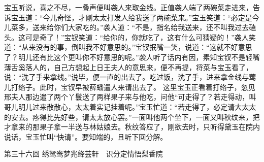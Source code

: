 \documentclass[12pt,oneside]{book}
\begin{document}
宝玉听说，喜之不尽，一叠声便叫袭人来取金线。正值袭人端了两碗菜走进来，告诉宝玉道：“今儿奇怪，才刚太太打发人给我送了两碗菜来。”宝玉笑道：“必定是今儿菜多，送来给你们大家吃的。”袭人道：“不是，指名给我送来，还不叫我过去磕头。这可是奇了！”宝钗笑道：“给你的，你就吃了，这有什么可猜疑的！”袭人笑道：“从来没有的事，倒叫我不好意思的。”宝钗抿嘴一笑，说道：“这就不好意思了？明儿还有比这个更叫你不好意思的呢。”袭人听了话内有因，素知宝钗不是轻嘴薄舌奚落人的，自己方想起上日王夫人的意思来，便不再提，将菜与宝玉看了，说：“洗了手来拿线。”说毕，便一直的出去了。吃过饭，洗了手，进来拿金线与莺儿打络子。此时，宝钗早被薛蟠遣人来请出去了。
这里宝玉正看着打络子，忽见邢夫人那边遣了两个丫鬟送了两样果子来与他吃，问他“可走得了？若走得动，叫哥儿明儿过来散散心，太太着实记挂着呢。”宝玉忙道：“若走得了，必定请大太太的安去。疼得比先好些，请太太放心罢。”一面叫他两个坐下，一面又叫秋纹来，把才拿来的那果子拿一半送与林姑娘去。秋纹答应了，刚欲去时，只听得黛玉在院内说话，宝玉忙叫“快请”。要知端的，且听下回分解。

 
第三十六回  绣鸳鸯梦兆绛芸轩　识分定情悟梨香院
\end{document}
